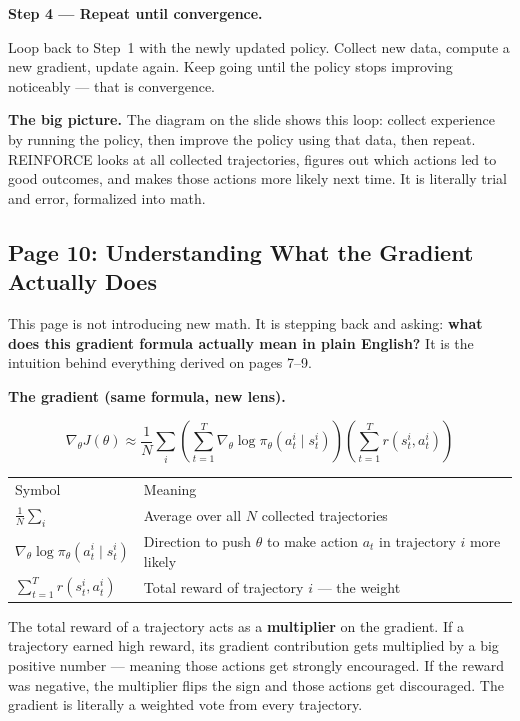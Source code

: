 \medskip
\textbf{Step 4 --- Repeat until convergence.}

Loop back to Step~1 with the newly updated policy. Collect new data, compute a new gradient,
update again. Keep going until the policy stops improving noticeably --- that is convergence.

\medskip
\textbf{The big picture.} The diagram on the slide shows this loop: collect experience by
running the policy, then improve the policy using that data, then repeat. REINFORCE looks at
all collected trajectories, figures out which actions led to good outcomes, and makes those
actions more likely next time. It is literally trial and error, formalized into math.


\subsection{Page 10: Understanding What the Gradient Actually Does}

This page is not introducing new math. It is stepping back and asking: \textbf{what does this
gradient formula actually mean in plain English?} It is the intuition behind everything derived
on pages 7--9.

\medskip
\textbf{The gradient (same formula, new lens).}

\[
  \nabla_\theta J(\theta)
  \approx \frac{1}{N}\sum_i
    \left(\sum_{t=1}^T\nabla_\theta\log\pi_\theta(a_t^i\mid s_t^i)\right)
    \left(\sum_{t=1}^T r(s_t^i,a_t^i)\right)
\]

\begin{tabular}{ll}
  Symbol & Meaning \\[4pt]
  $\frac{1}{N}\sum_i$ & Average over all $N$ collected trajectories \\
  $\nabla_\theta\log\pi_\theta(a_t^i\mid s_t^i)$ & Direction to push $\theta$ to make action $a_t$ in trajectory $i$ more likely \\
  $\sum_{t=1}^T r(s_t^i,a_t^i)$ & Total reward of trajectory $i$ --- the weight \\
\end{tabular}

\medskip
The total reward of a trajectory acts as a \textbf{multiplier} on the gradient. If a trajectory
earned high reward, its gradient contribution gets multiplied by a big positive number ---
meaning those actions get strongly encouraged. If the reward was negative, the multiplier
flips the sign and those actions get discouraged. The gradient is literally a weighted vote
from every trajectory.

